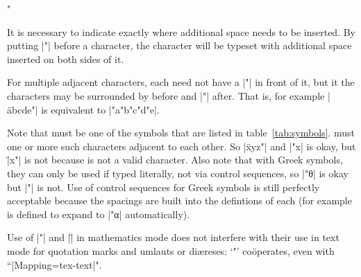 \documentclass{ltxdockit}
\makeatletter
\def\topbottomrule{\noalign{\ifnum0=`}\fi \@aboverulesep=\aboverulesep
  \global\@belowrulesep=\belowrulesep \global\@thisruleclass=\@ne
  \@ifnextchar[{\@BTrule}{\@BTrule[\heavyrulewidth]}}
\makeatother
\begin{document}
\begin{ltxsyntax}

\item["]

  It is necessary to indicate exactly where additional space needs to
  be inserted. By putting |"| before a character, the character will
  be typeset with additional space inserted on both sides of it.


  For multiple adjacent characters, each need not have a |"| in front
  of it, but it the characters may be surrounded by  before and
  |"| after. That is, for example |\"abcde"| is equivalent to
  |"a"b"c"d"e|.

  Note that  must be one of the symbols that are listed
  in table~\ref{tab:symbols}.  must one or more such
  characters adjacent to each other. So |\"xyz"| and |\sin"x| is okay,
  but |\"\sin x"| is not because  is not a valid
  character. Also note that with Greek symbols, they can only be used
  if typed literally, not via control sequences, so |\cos"θ| is okay
  but |\cos"\theta| is not. Use of control sequences for Greek symbols
  is still perfectly acceptable because the spacings are built into
  the defintions of each (for example  is defined to expand
  to |{"α}| automatically).

  \begin{table}
    \caption{All valid characters for use with \texttt" and \texttt{\textbackslash"}…\texttt".\label{tab:symbols}}
  \end{table}
  Use of |"| and |\"| in mathematics mode does not interfere with
  their use in text mode for quotation marks and umlauts or diæreses:
  ‘"’ co\"operates, even with
  {``|Mapping=tex-text|"}.



\end{ltxsyntax}
\end{document}
